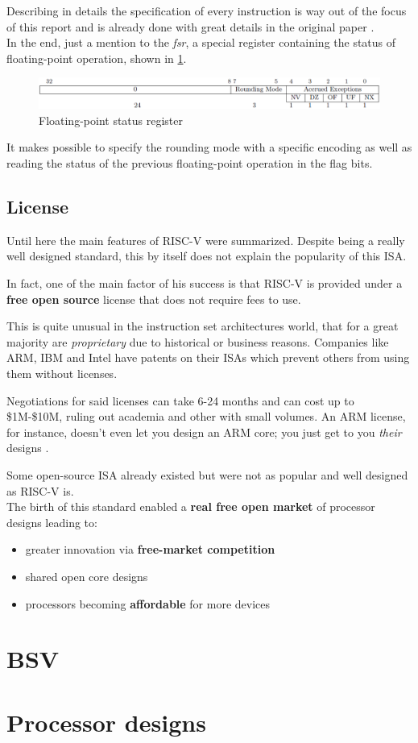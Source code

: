 \documentclass[12pt,oneside,a4paper]{article}
\begin{document}
Describing in details the specification of every instruction is way out of the focus of this report and is already done with great details in the original paper \cite{risc-v_original}.\\

In the end, just a mention to the \textit{fsr}, a special register containing the status of floating-point operation, shown in \cref{riscv:fsr}.

\begin{figure}[h]
	\centering
	\includegraphics[scale=0.575]{risc-v_fsr}
	\caption{Floating-point status register}
	\label{riscv:fsr}
\end{figure}

It makes possible to specify the rounding mode with a specific encoding as well as reading the status of the previous floating-point operation in the flag bits.
\subsection{License}
Until here the main features of RISC-V were summarized.
Despite being a really well designed standard, this by itself does not explain the popularity of this ISA.

In fact, one of the main factor of his success is that RISC-V is provided under a \textbf{free open source} license that does not require fees to use.

This is quite unusual in the instruction set architectures world, that for a great majority are \textit{proprietary} due to historical or business reasons. Companies like ARM, IBM and Intel have patents on their ISAs which prevent others from using them without licenses.

Negotiations for said licenses can take 6-24 months and can cost up to \$1M-\$10M, ruling out academia and other with small volumes. An ARM license, for instance, doesn't even let you design an ARM core; you just get to you \textit{their} designs \cite{risc-v_free}.

Some open-source ISA already existed but were not as popular and well designed as RISC-V is.\\

The birth of this standard enabled a \textbf{real free open market} of processor designs leading to:
\begin{itemize}
	\item greater innovation via \textbf{free-market competition}
	\item shared open core designs
	\item processors becoming \textbf{affordable} for more devices
\end{itemize}

\section{BSV}
\section{Processor designs}
\newpage
\printbibliography
\end{document}
